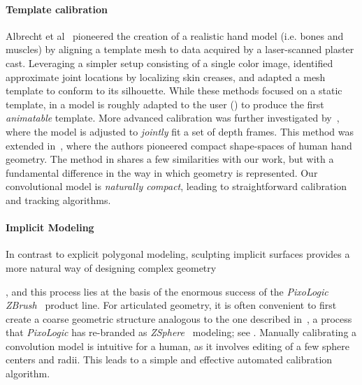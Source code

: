 \paragraph{Template calibration}
Albrecht et al~ pioneered the creation of a realistic hand model (i.e. bones and muscles) by aligning a template mesh to data acquired by a laser-scanned plaster cast. Leveraging a simpler setup consisting of a single color image, \cite{rhee2006hand} identified approximate joint locations by localizing skin creases, and adapted a mesh template to conform to its silhouette. While these methods focused on a static template, in \cite{delagorce2011model} a model is roughly adapted to the user () to produce the first \emph{animatable} template. More advanced calibration was further investigated by~\cite{taylor2014user}, where the model is adjusted to \emph{jointly} fit a set of depth frames. This method was extended in~\cite{khamis15learning}, where the authors pioneered compact   shape-spaces of human hand geometry.
% 
The method in \cite{taylor2014user} shares a few similarities with our work, but with a fundamental difference in the way in which geometry is represented. Our convolutional model is \emph{naturally compact}, leading to straightforward calibration and tracking algorithms. 


\paragraph{Implicit Modeling}
In contrast to explicit polygonal modeling, sculpting implicit surfaces provides a more natural way of designing complex geometry 

, and this process lies at the basis of the enormous success of the \emph{PixoLogic ZBrush~\textcopyright} product line. 
For articulated geometry, it is often convenient to first create a coarse geometric structure analogous to the one described in~, a process that \emph{PixoLogic} has re-branded as \emph{ZSphere~{\textcopyright}} modeling; see . Manually calibrating a convolution model is intuitive for a human, as it involves editing of a few sphere centers and radii. This leads to a simple and effective automated calibration algorithm. 

